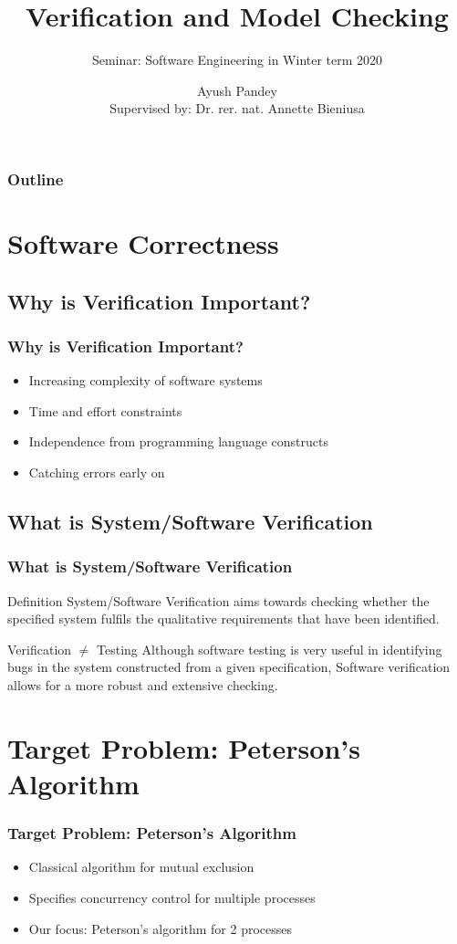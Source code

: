 \documentclass[xcolor=dvipsnames]{beamer}
\title{Verification and Model Checking}
\subtitle{Seminar: Software Engineering in Winter term 2020}
\author[Ayush Pandey]{Ayush Pandey\\
		\small { Supervised by: Dr. rer. nat. Annette Bieniusa }}
\institute[TU Kaiserslautern]{Department of Computer Science\\ Technische Universität Kaiserslautern}
\begin{document}
		
		\frame{\titlepage}

	\begin{frame}
		\frametitle{Outline}
		\tableofcontents
	\end{frame}


\section{Software Correctness}

\subsection{Why is Verification Important?}
\begin{frame}
	\frametitle{Why is Verification Important?}
	\begin{itemize}
		\item Increasing complexity of software systems
		\item Time and effort constraints
		\item Independence from programming language constructs
		\item Catching errors early on
	\end{itemize}
\end{frame}

\subsection{What is System/Software Verification}
\begin{frame}
	\frametitle{What is System/Software Verification}
	\begin{block}{Definition}
		System/Software Verification aims towards checking whether the specified system fulfils the qualitative requirements that have been identified.
	\end{block}
	\begin{alertblock}{Verification $\neq$ Testing}
		Although software testing is very useful in identifying bugs in the system constructed from a given specification, Software verification allows for a more robust and extensive checking. \cite{BeyerL17}
	\end{alertblock}
\end{frame}

\section{Target Problem: Peterson's Algorithm}
\begin{frame}
	\frametitle{Target Problem: Peterson's Algorithm}
	\begin{itemize}
		\item Classical algorithm for mutual exclusion 
		\item Specifies concurrency control for multiple processes
		\item Our focus: Peterson's algorithm for 2 processes
	\end{itemize}
	
\end{frame}
\end{document}
